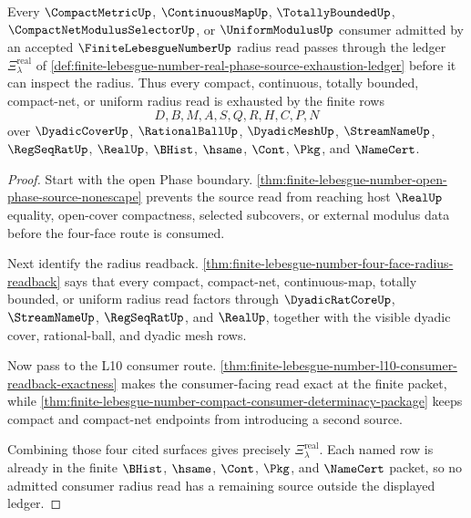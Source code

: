 \begin{theorem}
\label{thm:finite-lebesgue-number-real-phase-source-exhaustion}
Every $\CompactMetricUp$, $\ContinuousMapUp$, $\TotallyBoundedUp$, $\CompactNetModulusSelectorUp$, or $\UniformModulusUp$ consumer admitted by an accepted $\FiniteLebesgueNumberUp$ radius read passes through the ledger $\Xi_{\lambda}^{\mathrm{real}}$ of \autoref{def:finite-lebesgue-number-real-phase-source-exhaustion-ledger} before it can inspect the radius. Thus every compact, continuous, totally bounded, compact-net, or uniform radius read is exhausted by the finite rows
$$
D,B,M,A,S,Q,R,H,C,P,N
$$
over $\DyadicCoverUp$, $\RationalBallUp$, $\DyadicMeshUp$, $\StreamNameUp$, $\RegSeqRatUp$, $\RealUp$, $\BHist$, $\hsame$, $\Cont$, $\Pkg$, and $\NameCert$.
\end{theorem}
\begin{proof}
Start with the open Phase boundary. \autoref{thm:finite-lebesgue-number-open-phase-source-nonescape} prevents the source read from reaching host $\RealUp$ equality, open-cover compactness, selected subcovers, or external modulus data before the four-face route is consumed.

Next identify the radius readback. \autoref{thm:finite-lebesgue-number-four-face-radius-readback} says that every compact, compact-net, continuous-map, totally bounded, or uniform radius read factors through $\DyadicRatCoreUp$, $\StreamNameUp$, $\RegSeqRatUp$, and $\RealUp$, together with the visible dyadic cover, rational-ball, and dyadic mesh rows.

Now pass to the L10 consumer route. \autoref{thm:finite-lebesgue-number-l10-consumer-readback-exactness} makes the consumer-facing read exact at the finite packet, while \autoref{thm:finite-lebesgue-number-compact-consumer-determinacy-package} keeps compact and compact-net endpoints from introducing a second source.

Combining those four cited surfaces gives precisely $\Xi_{\lambda}^{\mathrm{real}}$. Each named row is already in the finite $\BHist$, $\hsame$, $\Cont$, $\Pkg$, and $\NameCert$ packet, so no admitted consumer radius read has a remaining source outside the displayed ledger.
\end{proof}

